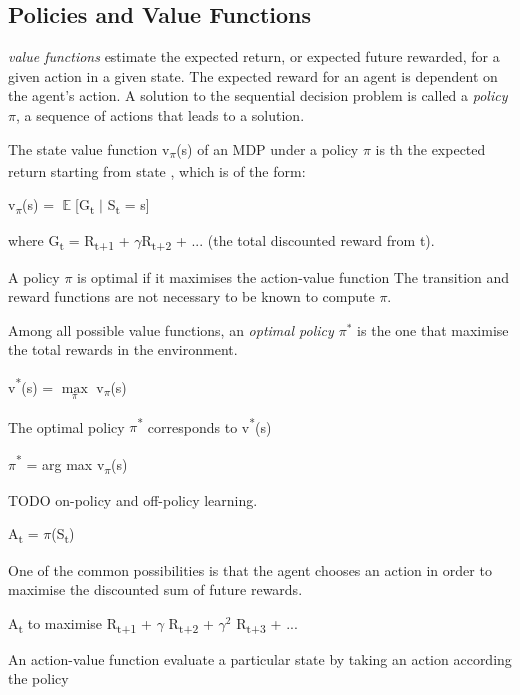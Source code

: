 \documentclass[12pt,twoside]{report}
\DeclareMathOperator{\E}{\mathbb{E}}
\begin{document}
\subsection{Policies and Value Functions}
\label{policy_value_functions_subsection}

\textit{value functions} estimate the expected return, or expected future rewarded,  for a given action in a given state. The expected reward for an agent is dependent on the agent's action. A solution to the sequential decision problem is called a \textit{policy $\pi$}, a sequence of actions that leads to a solution.

The state value function v\textsubscript{$\pi$}(s) of an MDP under a policy $\pi$ is th the expected return starting from state , which is of the form:

v\textsubscript{$\pi$}(s) = $\displaystyle \E$[G\textsubscript{t} $\vert$ S\textsubscript{t} = s]

where G\textsubscript{t} = R\textsubscript{t+1} + $\gamma$R\textsubscript{t+2} + ... (the total discounted reward from t).

A policy $\pi$ is optimal if it maximises the action-value function
The transition and reward functions are not necessary to be known to compute $\pi$.

Among all possible value functions, an \textit{optimal policy $\pi^*$} is the one that maximise the total rewards in the environment.

v\textsuperscript{*}(s) = $\underset{\pi}{\max}$ v\textsubscript{$\pi$}(s)

The optimal policy $\pi$\textsuperscript{*} corresponds to v\textsuperscript{*}(s)

$\pi$\textsuperscript{*} = arg max v\textsubscript{$\pi$}(s)


TODO on-policy and off-policy learning.

A\textsubscript{t} = $\pi$(S\textsubscript{t})

One of the common possibilities is that the agent chooses an action in order to maximise the discounted sum of future rewards.

A\textsubscript{t} to maximise R\textsubscript{t+1} + $\gamma$ R\textsubscript{t+2} + $\gamma^2$ R\textsubscript{t+3} + ...

An action-value function evaluate a particular state by taking an action according the policy
\end{document}

